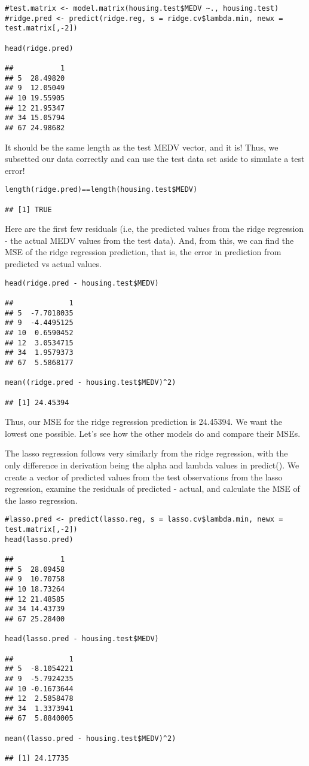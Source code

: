 \documentclass[]{article}
\begin{document}
\begin{verbatim}
#test.matrix <- model.matrix(housing.test$MEDV ~., housing.test)
#ridge.pred <- predict(ridge.reg, s = ridge.cv$lambda.min, newx = test.matrix[,-2])

head(ridge.pred)

##           1
## 5  28.49820
## 9  12.05049
## 10 19.55905
## 12 21.95347
## 34 15.05794
## 67 24.98682
\end{verbatim}

It should be the same length as the test MEDV vector, and it is! Thus,
we subsetted our data correctly and can use the test data set aside to
simulate a test error!

\begin{verbatim}
length(ridge.pred)==length(housing.test$MEDV)

## [1] TRUE
\end{verbatim}

Here are the first few residuals (i.e, the predicted values from the
ridge regression - the actual MEDV values from the test data). And, from
this, we can find the MSE of the ridge regression prediction, that is,
the error in prediction from predicted vs actual values.

\begin{verbatim}
head(ridge.pred - housing.test$MEDV)

##             1
## 5  -7.7018035
## 9  -4.4495125
## 10  0.6590452
## 12  3.0534715
## 34  1.9579373
## 67  5.5868177

mean((ridge.pred - housing.test$MEDV)^2)

## [1] 24.45394
\end{verbatim}

Thus, our MSE for the ridge regression prediction is 24.45394. We want
the lowest one possible. Let's see how the other models do and compare
their MSEs.

The lasso regression follows very similarly from the ridge regression,
with the only difference in derivation being the alpha and lambda values
in predict(). We create a vector of predicted values from the test
observations from the lasso regression, examine the residuals of
predicted - actual, and calculate the MSE of the lasso regression.

\begin{verbatim}
#lasso.pred <- predict(lasso.reg, s = lasso.cv$lambda.min, newx = test.matrix[,-2])
head(lasso.pred)

##           1
## 5  28.09458
## 9  10.70758
## 10 18.73264
## 12 21.48585
## 34 14.43739
## 67 25.28400

head(lasso.pred - housing.test$MEDV)

##             1
## 5  -8.1054221
## 9  -5.7924235
## 10 -0.1673644
## 12  2.5858478
## 34  1.3373941
## 67  5.8840005

mean((lasso.pred - housing.test$MEDV)^2)

## [1] 24.17735
\end{verbatim}
\end{document}
